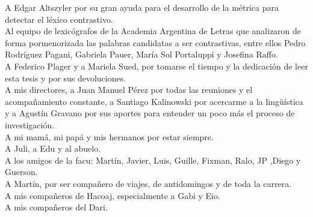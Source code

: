 \noindent A Edgar Altszyler por su gran ayuda para el desarrollo de la métrica para detectar el léxico contrastivo.\\

\noindent Al equipo de lexicógrafos de la Academia Argentina de Letras que analizaron de forma pormenorizada las palabras candidatas a ser contrastivas, entre ellos Pedro Rodríguez Pagani, Gabriela Pauer, María Sol Portaluppi y Josefina Raffo.\\

\noindent A Federico Plager y a Mariela Sued, por tomarse el tiempo y la dedicación de leer esta tesis y por sus devoluciones.\\

\noindent A mis directores, a Juan Manuel Pérez por todas las reuniones y el acompañamiento constante, a Santiago Kalinowski por acercarme a la lingüística y a Agustín Gravano por sus aportes para entender un poco más el proceso de investigación.\\

\noindent A mi mamá, mi papá y mis hermanos por estar siempre.\\

\noindent A Juli, a Edu y al abuelo.\\

\noindent A los amigos de la facu: Martín, Javier, Luis, Guille, Fixman, Ralo, JP ,Diego y Guerson.\\

\noindent A Martín, por ser compañero de viajes, de antidomingos y de toda la carrera.\\

\noindent A mis compañeros de Hacoaj, especialmente a Gabi y Eio.\\

\noindent A mis compañeros del Dari.\\